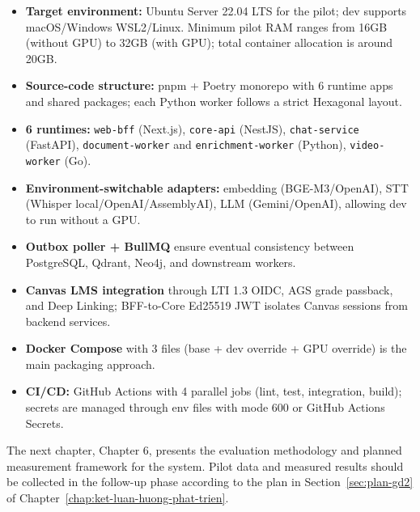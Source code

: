 \begin{itemize}
    \item \textbf{Target environment:} Ubuntu Server 22.04 LTS for the
          pilot; dev supports macOS/Windows WSL2/Linux. Minimum pilot
          RAM ranges from 16GB (without GPU) to 32GB (with GPU); total
          container allocation is around 20GB.
    \item \textbf{Source-code structure:} pnpm + Poetry monorepo with 6
          runtime apps and shared packages; each Python worker follows a
          strict Hexagonal layout.
    \item \textbf{6 runtimes:} \texttt{web-bff} (Next.js),
          \texttt{core-api} (NestJS), \texttt{chat-service} (FastAPI),
          \texttt{document-worker} and \texttt{enrichment-worker}
          (Python), \texttt{video-worker} (Go).
    \item \textbf{Environment-switchable adapters:} embedding
          (BGE-M3/OpenAI), STT (Whisper local/OpenAI/AssemblyAI), LLM
          (Gemini/OpenAI), allowing dev to run without a GPU.
    \item \textbf{Outbox poller + BullMQ} ensure eventual consistency
          between PostgreSQL, Qdrant, Neo4j, and downstream workers.
    \item \textbf{Canvas LMS integration} through LTI 1.3 OIDC, AGS
          grade passback, and Deep Linking; BFF-to-Core Ed25519 JWT
          isolates Canvas sessions from backend services.
    \item \textbf{Docker Compose} with 3 files (base + dev override +
          GPU override) is the main packaging approach.
    \item \textbf{CI/CD:} GitHub Actions with 4 parallel jobs (lint,
          test, integration, build); secrets are managed through env
          files with mode 600 or GitHub Actions Secrets.
\end{itemize}

The next chapter, Chapter 6, presents the evaluation methodology and
planned measurement framework for the system. Pilot data and measured
results should be collected in the follow-up phase according to the plan
in Section~\ref{sec:plan-gd2} of
Chapter~\ref{chap:ket-luan-huong-phat-trien}.
